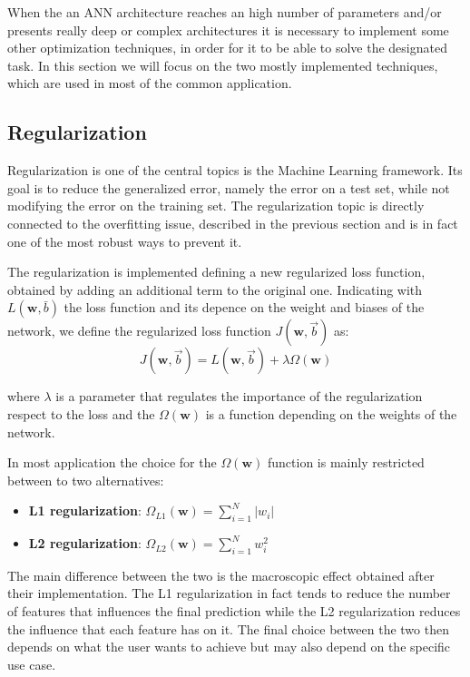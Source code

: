 When the an ANN architecture reaches an high number of parameters and/or  presents really deep or complex architectures it is necessary to implement some other optimization techniques, in order for it to be able to solve the designated task. In this section we will focus on the two mostly implemented techniques, which are used in most of the common application.

\subsection{Regularization}\label{regularization}

Regularization is one of the central topics is the Machine Learning framework\cite{reg_gen}. Its goal is to reduce the generalized error, namely the error on a test set, while not modifying the error on the training set. The regularization topic is directly connected to the overfitting issue, described in the previous section and is in fact one of the most robust ways to prevent it. 

The regularization is implemented defining a new regularized loss function, obtained by adding an additional term to the original one. Indicating with $L(\boldsymbol{w},\bar{b})$ the loss function and its depence on the weight and biases of the network, we define the regularized loss function $J(\mathbf{w}, \vec{b})$ as:
\begin{equation}
J(\mathbf{w}, \vec{b})=L(\mathbf{w}, \vec{b})+ \lambda\Omega(\mathbf{w})
\end{equation}

where $\lambda$ is a parameter that regulates the importance of the regularization respect to the loss and the $\Omega(\mathbf{w})$ is a function depending on the weights of the network. 

In most application the choice for the $\Omega(\mathbf{w})$ function is mainly restricted between to two alternatives:
\begin{itemize}
    \item \textbf{L1 regularization}: $\Omega_{L1}(\mathbf{w}) = \sum_{i=1}^N |w_i|$
    \item \textbf{L2 regularization}: $\Omega_{L2}(\mathbf{w}) = \sum_{i=1}^N w_i^2$
\end{itemize}

The main difference between the two is the macroscopic effect obtained after their implementation. The L1 regularization in fact tends to reduce the number of features that influences the final prediction while the L2 regularization reduces the influence that each feature has on it. The final choice between the two then depends on what the user wants to achieve but may also depend on the specific use case\cite{l1reg,l2reg}.


